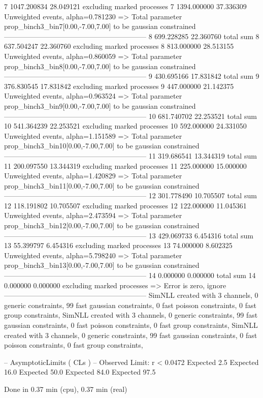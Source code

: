 7          1047.200834     28.049121       excluding marked processes    
7          1394.000000     37.336309       Unweighted events, alpha=0.781230
  => Total parameter prop_binch3_bin7[0.00,-7.00,7.00] to be gaussian constrained
------------------------------------------------------------
8          699.228285      22.360760       total sum                     
8          637.504247      22.360760       excluding marked processes    
8          813.000000      28.513155       Unweighted events, alpha=0.860059
  => Total parameter prop_binch3_bin8[0.00,-7.00,7.00] to be gaussian constrained
------------------------------------------------------------
9          430.695166      17.831842       total sum                     
9          376.830545      17.831842       excluding marked processes    
9          447.000000      21.142375       Unweighted events, alpha=0.963524
  => Total parameter prop_binch3_bin9[0.00,-7.00,7.00] to be gaussian constrained
------------------------------------------------------------
10         681.740702      22.253521       total sum                     
10         541.364239      22.253521       excluding marked processes    
10         592.000000      24.331050       Unweighted events, alpha=1.151589
  => Total parameter prop_binch3_bin10[0.00,-7.00,7.00] to be gaussian constrained
------------------------------------------------------------
11         319.686541      13.344319       total sum                     
11         200.097550      13.344319       excluding marked processes    
11         225.000000      15.000000       Unweighted events, alpha=1.420829
  => Total parameter prop_binch3_bin11[0.00,-7.00,7.00] to be gaussian constrained
------------------------------------------------------------
12         301.778490      10.705507       total sum                     
12         118.191802      10.705507       excluding marked processes    
12         122.000000      11.045361       Unweighted events, alpha=2.473594
  => Total parameter prop_binch3_bin12[0.00,-7.00,7.00] to be gaussian constrained
------------------------------------------------------------
13         429.069733      6.454316        total sum                     
13         55.399797       6.454316        excluding marked processes    
13         74.000000       8.602325        Unweighted events, alpha=5.798240
  => Total parameter prop_binch3_bin13[0.00,-7.00,7.00] to be gaussian constrained
------------------------------------------------------------
14         0.000000        0.000000        total sum                     
14         0.000000        0.000000        excluding marked processes    
  => Error is zero, ignore      
------------------------------------------------------------
SimNLL created with 3 channels, 0 generic constraints, 99 fast gaussian constraints, 0 fast poisson constraints, 0 fast group constraints, 
SimNLL created with 3 channels, 0 generic constraints, 99 fast gaussian constraints, 0 fast poisson constraints, 0 fast group constraints, 
SimNLL created with 3 channels, 0 generic constraints, 99 fast gaussian constraints, 0 fast poisson constraints, 0 fast group constraints, 

 -- AsymptoticLimits ( CLs ) --
Observed Limit: r < 0.0472
Expected  2.5%
Expected 16.0%
Expected 50.0%
Expected 84.0%
Expected 97.5%

Done in 0.37 min (cpu), 0.37 min (real)
